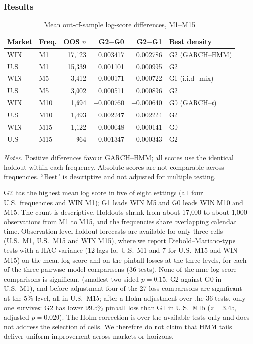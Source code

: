 \documentclass[11pt,a4paper]{article}
\theoremstyle{plain}
\theoremstyle{remark}
\begin{document}
\subsubsection{Results}
\begin{table}[ht]
\centering\small
\caption{Mean out-of-sample log-score differences, M1--M15}\label{tab:m1m15}
\begin{tabular}{llrrrl}
\toprule
Market & Freq. & OOS $n$ & G2$-$G0 & G2$-$G1 & Best density\\
\midrule
WIN & M1 & 17{,}123 & 0.003417 & 0.002786 & G2 (GARCH--HMM)\\
U.S. & M1 & 15{,}339 & 0.001101 & 0.000995 & G2\\
WIN & M5 & 3{,}412 & 0.000171 & $-$0.000722 & G1 (i.i.d.\ mix)\\
U.S. & M5 & 3{,}002 & 0.000511 & 0.000896 & G2\\
WIN & M10 & 1{,}694 & $-$0.000760 & $-$0.000640 & G0 (GARCH--$t$)\\
U.S. & M10 & 1{,}493 & 0.002247 & 0.002224 & G2\\
WIN & M15 & 1{,}122 & $-$0.000048 & 0.000141 & G0\\
U.S. & M15 & 964 & 0.001347 & 0.000343 & G2\\
\bottomrule
\end{tabular}
\par\smallskip\footnotesize\emph{Notes.} Positive differences favour GARCH--HMM; all scores use the identical holdout within each frequency. Absolute scores are not comparable across frequencies. ``Best'' is descriptive and not adjusted for multiple testing.
\end{table}

G2 has the highest mean log score in five of eight settings (all four U.S.\ frequencies and WIN M1); G1 leads WIN M5 and G0 leads WIN M10 and M15. The count is descriptive. Holdouts shrink from about 17{,}000 to about 1{,}000 observations from M1 to M15, and the frequencies share overlapping calendar time. Observation-level holdout forecasts are available for only three cells (U.S.\ M1, U.S.\ M15 and WIN M15), where we report Diebold--Mariano-type tests \citep{diebold1995} with a HAC variance (12 lags for U.S.\ M1 and 7 for U.S.\ M15 and WIN M15) on the mean log score and on the pinball losses at the three levels, for each of the three pairwise model comparisons (36 tests). None of the nine log-score comparisons is significant (smallest two-sided $p=0.15$, G2 against G0 in U.S.\ M1), and before adjustment four of the 27 loss comparisons are significant at the 5\% level, all in U.S.\ M15; after a Holm adjustment over the 36 tests, only one survives: G2 has lower 99.5\% pinball loss than G1 in U.S.\ M15 ($z=3.45$, adjusted $p=0.020$). The Holm correction is over the available tests only and does not address the selection of cells.  We therefore do not claim that HMM tails deliver uniform improvement across markets or horizons.
\end{document}
